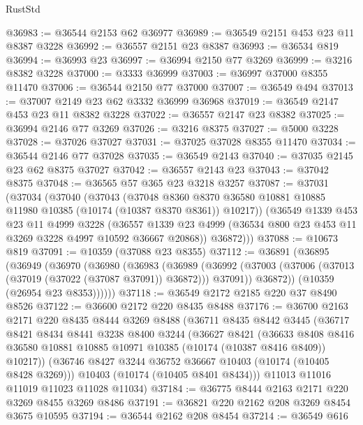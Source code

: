 \begin{lexlean}{RustStd}
\begin{coremodule}
@36983 := @36544 @2153 @62 @36977
@36989 := @36549 @2151 @453 @23 @11 @8387 @3228
@36992 := @36557 @2151 @23 @8387
@36993 := @36534 @819
@36994 := @36993 @23
@36997 := @36994 @2150 @77 @3269
@36999 := @3216 @8382 @3228
@37000 := @3333 @36999
@37003 := @36997 @37000 @8355 @11470
@37006 := @36544 @2150 @77 @37000
@37007 := @36549 @494
@37013 := @37007 @2149 @23 @62 @3332 @36999 @36968
@37019 := @36549 @2147 @453 @23 @11 @8382 @3228
@37022 := @36557 @2147 @23 @8382
@37025 := @36994 @2146 @77 @3269
@37026 := @3216 @8375
@37027 := @5000 @3228
@37028 := @37026 @37027
@37031 := @37025 @37028 @8355 @11470
@37034 := @36544 @2146 @77 @37028
@37035 := @36549 @2143
@37040 := @37035 @2145 @23 @62 @8375 @37027
@37042 := @36557 @2143 @23
@37043 := @37042 @8375
@37048 := @36565 @57 @365 @23 @3218 @3257
@37087 := @37031
    (@37034
      (@37040
        (@37043
          (@37048
            @8360
            @8370
            @36580
            @10881
            @10885
            @11980
            @10385
            (@10174 (@10387 @8370 @8361))
            @10217))
        (@36549
          @1339
          @453
          @23
          @11
          @4999
          @3228
          (@36557 @1339 @23 @4999 (@36534 @800 @23 @453 @11 @3269 @3228 @4997 @10592 @36667 @20868))
          @36872)))
@37088 := @10673 @819
@37091 := @10359 (@37088 @23 @8355)
@37112 := @36891
    (@36895
      (@36949
        (@36970
          (@36980
            (@36983
              (@36989
                (@36992 (@37003 (@37006 (@37013 (@37019 (@37022 (@37087 @37091)) @36872))) @37091))
                @36872))
            (@10359 (@26954 @23 @8353))))))
@37118 := @36549 @2172 @2185 @220 @37 @8490 @8526
@37122 := @36600 @2172 @220 @8435 @8488
@37176 := @36700
    @2163
    @2171
    @220
    @8435
    @8444
    @3269
    @8488
    (@36711
      @8435
      @8442
      @3445
      (@36717
        @8421
        @8434
        @8441
        @3238
        @8400
        @3244
        (@36627
          @8421
          (@36633
            @8408
            @8416
            @36580
            @10881
            @10885
            @10971
            @10385
            (@10174 (@10387 @8416 @8409))
            @10217))
        (@36746 @8427 @3244 @36752 @36667 @10403 (@10174 (@10405 @8428 @3269)))
        @10403
        (@10174 (@10405 @8401 @8434)))
      @11013
      @11016
      @11019
      @11023
      @11028
      @11034)
@37184 := @36775 @8444 @2163 @2171 @220 @3269 @8455 @3269 @8486
@37191 := @36821 @220 @2162 @208 @3269 @8454 @3675 @10595
@37194 := @36544 @2162 @208 @8454
@37214 := @36549
    @616

\end{coremodule}
\end{lexlean}
